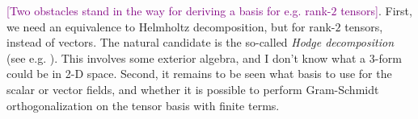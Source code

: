 \documentclass[a4paper, 11pt]{article}
\newcommand{\todoitem}[1]{\textcolor{purple}{[#1]}}
\begin{document}
\todoitem{Two obstacles stand in the way for deriving a basis for e.g. rank-$2$ tensors}. First, we need an equivalence to Helmholtz decomposition, but for rank-$2$ tensors, instead of vectors. The natural candidate is the so-called \textit{Hodge decomposition} (see e.g. \cite{bhatia_helmholtz-hodge_2013}). This involves some exterior algebra, and I don't know what a $3$-form could be in 2-D space. Second, it remains to be seen what basis to use for the scalar or vector fields, and whether it is possible to perform Gram-Schmidt orthogonalization on the tensor basis with finite terms.

\printbibliography
\end{document}
